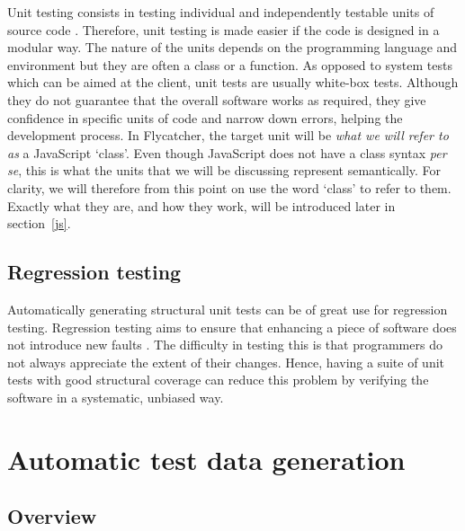 Unit testing consists in testing individual and independently testable units of source code \cite{myers2011art}. Therefore, unit testing is made easier if the code is designed in a modular way. The nature of the units depends on the programming language and environment but they are often a class or a function. As opposed to system tests which can be aimed at the client, unit tests are usually white-box tests. Although they do not guarantee that the overall software works as required, they give confidence in specific units of code and narrow down errors, helping the development process. In \textsf{Flycatcher}, the target unit will be \emph{what we will refer to as} a JavaScript `class'. Even though JavaScript does not have a class syntax \emph{per se}, this is what the units that we will be discussing represent semantically. For clarity, we will therefore from this point on use the word `class' to refer to them. Exactly what they are, and how they work, will be introduced later in section~\ref{js}.

\subsection{Regression testing}
Automatically generating structural unit tests can be of great use for regression testing. Regression testing aims to ensure that enhancing a piece of software does not introduce new faults \cite{myers2011art}. The difficulty in testing this is that programmers do not always appreciate the extent of their changes. Hence, having a suite of unit tests with good structural coverage can reduce this problem by verifying the software in a systematic, unbiased way.

\section{Automatic test data generation}
\subsection{Overview}

